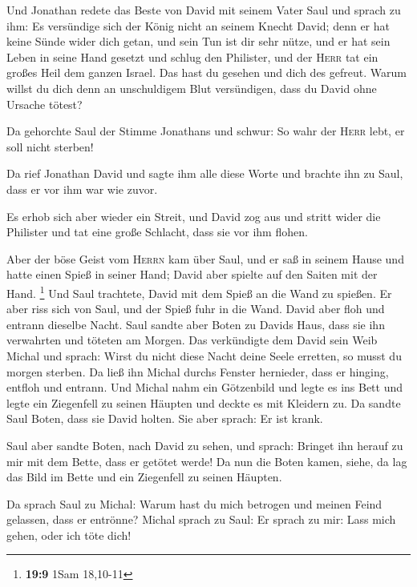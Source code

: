  Und Jonathan redete das Beste von David mit seinem Vater
Saul und sprach zu ihm: Es versündige sich der König nicht an seinem
Knecht David; denn er hat keine Sünde wider dich getan, und sein Tun ist
dir sehr nütze,  und er hat sein Leben in seine Hand
gesetzt und schlug den Philister, und der \textsc{Herr} tat ein großes
Heil dem ganzen Israel. Das hast du gesehen und dich des gefreut. Warum
willst du dich denn an unschuldigem Blut versündigen, dass du David ohne
Ursache tötest?

 Da gehorchte Saul der Stimme Jonathans und schwur: So
wahr der \textsc{Herr} lebt, er soll nicht sterben!

 Da rief Jonathan David und sagte ihm alle diese Worte und
brachte ihn zu Saul, dass er vor ihm war wie zuvor.

 Es erhob sich aber wieder ein Streit, und David zog aus
und stritt wider die Philister und tat eine große Schlacht, dass sie vor
ihm flohen.

 Aber der böse Geist vom \textsc{Herrn} kam über Saul, und
er saß in seinem Hause und hatte einen Spieß in seiner Hand; David aber
spielte auf den Saiten mit der Hand. \footnote{\textbf{19:9} 1Sam
  18,10-11}  Und Saul trachtete, David mit dem Spieß an
die Wand zu spießen. Er aber riss sich von Saul, und der Spieß fuhr in
die Wand. David aber floh und entrann dieselbe Nacht. 
Saul sandte aber Boten zu Davids Haus, dass sie ihn verwahrten und
töteten am Morgen. Das verkündigte dem David sein Weib Michal und
sprach: Wirst du nicht diese Nacht deine Seele erretten, so musst du
morgen sterben.  Da ließ ihn Michal durchs Fenster
hernieder, dass er hinging, entfloh und entrann.  Und
Michal nahm ein Götzenbild und legte es ins Bett und legte ein
Ziegenfell zu seinen Häupten und deckte es mit Kleidern zu.
 Da sandte Saul Boten, dass sie David holten. Sie aber
sprach: Er ist krank.

 Saul aber sandte Boten, nach David zu sehen, und sprach:
Bringet ihn herauf zu mir mit dem Bette, dass er getötet werde!
 Da nun die Boten kamen, siehe, da lag das Bild im Bette
und ein Ziegenfell zu seinen Häupten.

 Da sprach Saul zu Michal: Warum hast du mich betrogen
und meinen Feind gelassen, dass er entrönne? Michal sprach zu Saul: Er
sprach zu mir: Lass mich gehen, oder ich töte dich!

